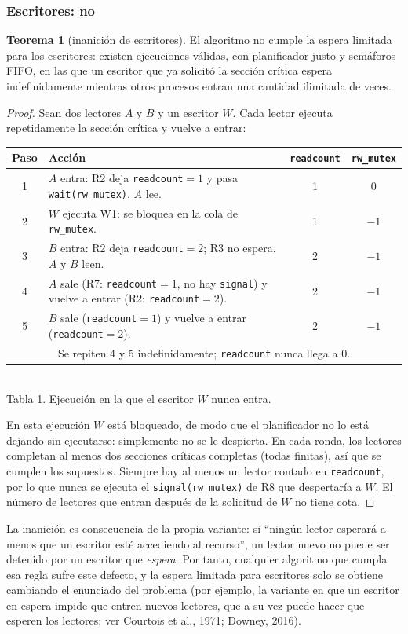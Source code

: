 \documentclass[12pt,letterpaper]{article}
\theoremstyle{definition}
\newtheorem{teorema}{Teorema}
\newcommand{\sem}[1]{\texttt{#1}}
\begin{document}
\subsubsection*{Escritores: no}
\begin{teorema}[inanición de escritores]\label{teo:inan}
El algoritmo no cumple la espera limitada para los escritores: existen ejecuciones válidas, con planificador justo y semáforos FIFO, en las que un escritor que ya solicitó la sección crítica espera indefinidamente mientras otros procesos entran una cantidad ilimitada de veces.
\end{teorema}
\begin{proof}
Sean dos lectores $A$ y $B$ y un escritor $W$. Cada lector ejecuta repetidamente la sección crítica y vuelve a entrar:
\begin{center}
\small
\renewcommand{\arraystretch}{1.15}
\begin{tabular}{|c|p{6.4cm}|c|c|}
\hline
\textbf{Paso} & \textbf{Acción} & \texttt{readcount} & \texttt{rw\_mutex}\\
\hline
1 & $A$ entra: R2 deja \texttt{readcount}$=1$ y pasa \sem{wait(rw\_mutex)}. $A$ lee. & 1 & 0\\ \hline
2 & $W$ ejecuta W1: se bloquea en la cola de \sem{rw\_mutex}. & 1 & $-1$\\ \hline
3 & $B$ entra: R2 deja \texttt{readcount}$=2$; R3 no espera. $A$ y $B$ leen. & 2 & $-1$\\ \hline
4 & $A$ sale (R7: \texttt{readcount}$=1$, no hay \sem{signal}) y vuelve a entrar (R2: \texttt{readcount}$=2$). & 2 & $-1$\\ \hline
5 & $B$ sale (\texttt{readcount}$=1$) y vuelve a entrar (\texttt{readcount}$=2$). & 2 & $-1$\\ \hline
\multicolumn{4}{|c|}{Se repiten 4 y 5 indefinidamente; \texttt{readcount} nunca llega a 0.}\\
\hline
\end{tabular}\\[3pt]
{\footnotesize Tabla 1. Ejecución en la que el escritor $W$ nunca entra.}
\end{center}
En esta ejecución $W$ está bloqueado, de modo que el planificador no lo está dejando sin ejecutarse: simplemente no se le despierta. En cada ronda, los lectores completan al menos dos secciones críticas completas (todas finitas), así que se cumplen los supuestos. Siempre hay al menos un lector contado en \sem{readcount}, por lo que nunca se ejecuta el \sem{signal(rw\_mutex)} de R8 que despertaría a $W$. El número de lectores que entran después de la solicitud de $W$ no tiene cota. \qedhere
\end{proof}
La inanición es consecuencia de la propia variante: si ``ningún lector esperará a menos que un escritor esté accediendo al recurso'', un lector nuevo no puede ser detenido por un escritor que \emph{espera}. Por tanto, cualquier algoritmo que cumpla esa regla sufre este defecto, y la espera limitada para escritores solo se obtiene cambiando el enunciado del problema (por ejemplo, la variante en que un escritor en espera impide que entren nuevos lectores, que a su vez puede hacer que esperen los lectores; ver Courtois et al., 1971; Downey, 2016).
\end{document}

